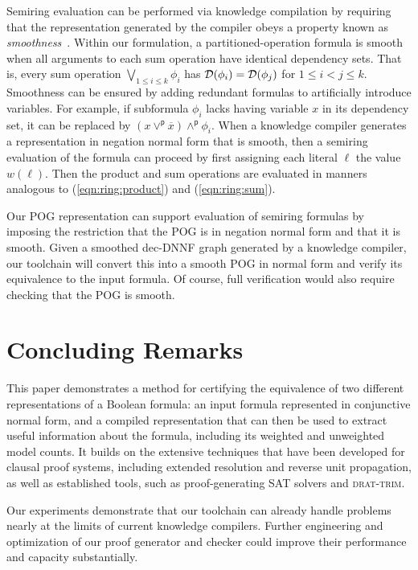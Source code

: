 \documentclass[twoside,11pt]{article}
\newcommand{\pand}{\mathbin{\land^\textsf{p}}}
\newcommand{\por}{\mathbin{\lor^\textsf{p}}}
\newcommand{\obar}[1]{\overline{#1}}
\newcommand{\lit}{\ell}
\newcommand{\dependencyset}{{\cal D}}
\newcommand{\progname}[1]{\textsc{#1}}
\newcommand{\dtrim}{\progname{drat-trim}}
\begin{document}
Semiring evaluation can be performed via knowledge compilation
by requiring 
that the representation generated by
the compiler obeys a property known as
\emph{smoothness}~\cite{darwiche:jair:2002,shih:nips:2019}.  Within our formulation,
a partitioned-operation formula is smooth when all arguments to each
sum operation have identical dependency sets.  That is, every sum
operation $\bigvee_{1 \leq i \leq k} \phi_i$ has
$\dependencyset(\phi_i) = \dependencyset(\phi_j)$ for $1 \leq i < j
\leq k$.  Smoothness can be ensured by adding redundant formulas to
artificially introduce variables.  For example, if subformula $\phi_i$
lacks having variable $x$ in its dependency set, it can be replaced by
$(x \por \obar{x}) \pand \phi_i$.  When a knowledge compiler generates
a representation in negation normal form that is smooth, then a semiring evaluation of the formula
can proceed by first assigning each literal $\lit$ the value $w(\lit)$.
Then the product and sum operations are evaluated in manners analogous to
(\ref{eqn:ring:product}) and
(\ref{eqn:ring:sum}).

Our POG representation can support evaluation of semiring formulas by
imposing the restriction that the POG is in negation normal form and that it is smooth.
Given a smoothed
dec-DNNF graph generated by a knowledge compiler, our toolchain will
convert this into a smooth POG in normal form and verify its
equivalence to the input formula.  Of course, full verification would also require checking that the POG is smooth.


\section{Concluding Remarks}
\label{sect:future}

This paper demonstrates a method for certifying the equivalence of two
different representations of a Boolean formula: an input formula
represented in conjunctive normal form, and a compiled representation
that can then be used to extract useful information about the formula,
including its weighted and unweighted model counts.  It builds on the
extensive techniques that have been developed for clausal
proof systems, including extended resolution and reverse unit propagation, as well as established tools, such as
proof-generating SAT solvers and \dtrim{}.


Our experiments demonstrate that our toolchain can already handle
problems nearly at the limits of current knowledge compilers.  Further
engineering and optimization of our proof generator and checker could
improve their performance and capacity substantially.  







\end{document}
